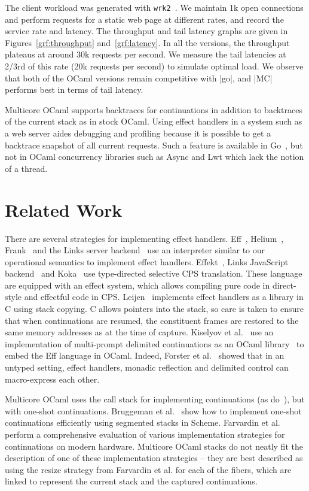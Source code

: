 \documentclass[sigplan,screen]{acmart}
\begin{document}
The client workload was generated with \texttt{wrk2}~\cite{wrk2}. We maintain
1k open connections and perform requests for a static web page at different
rates, and record the service rate and latency. The throughput and tail latency
graphs are given in Figures~\ref{grf:throughput} and~\ref{grf:latency}. In all
the versions, the throughput plateaus at around 30k requests per second. We
measure the tail latencies at 2/3rd of this rate (20k requests per second) to
simulate optimal load. We observe that both of the OCaml versions remain
competitive with |go|, and |MC| performs best in terms of tail latency.

Multicore OCaml supports backtraces for continuations in addition to backtraces
of the current stack as in stock OCaml. Using effect handlers in a system such
as a web server aides debugging and profiling because it is possible to get a
backtrace snapshot of all current requests. Such a feature is available in
Go~\cite{gopprof}, but not in OCaml concurrency libraries such as Async and
Lwt which lack the notion of a thread.

\section{Related Work}
\label{sec:related}

There are several strategies for implementing effect handlers. Eff~\cite{Eff},
Helium~\cite{Biernacki20}, Frank~\cite{Frank} and the Links server
backend~\cite{Hillerstrom20} use an interpreter similar to our operational
semantics to implement effect handlers. Effekt~\cite{Effekt}, Links JavaScript
backend~\cite{Hillerstrom20} and Koka~\cite{Leijen17} use type-directed
selective CPS translation. These language are equipped with an effect system,
which allows compiling pure code in direct-style and effectful code in CPS.
Leijen~\cite{Leijen14} implements effect handlers as a library in C using stack
copying. C allows pointers into the stack, so care is taken to ensure that
when continuations are resumed, the constituent frames are restored to the same
memory addresses as at the time of capture. Kiselyov et al.~\cite{Kiselyov18}
use an implementation of multi-prompt delimited continuations as an OCaml
library~\cite{Kiselyov12} to embed the Eff language in OCaml. Indeed, Forster et
al.~\cite{Forster19} showed that in an untyped setting, effect handlers,
monadic reflection and delimited control can macro-express each other.

Multicore OCaml uses the call stack for implementing continuations (as
do~\cite{Leijen14, Kiselyov12}), but with one-shot continuations. Bruggeman et
al.~\cite{Bruggeman96} show how to implement one-shot continuations efficiently
using segmented stacks in Scheme. Farvardin et al.~\cite{Farvardin20} perform a
comprehensive evaluation of various implementation strategies for continuations
on modern hardware. Multicore OCaml stacks do not neatly fit the description of
one of these implementation strategies -- they are best described as using the
resize strategy from Farvardin et al. for each of the fibers, which are
linked to represent the current stack and the captured continuations.
\end{document}
